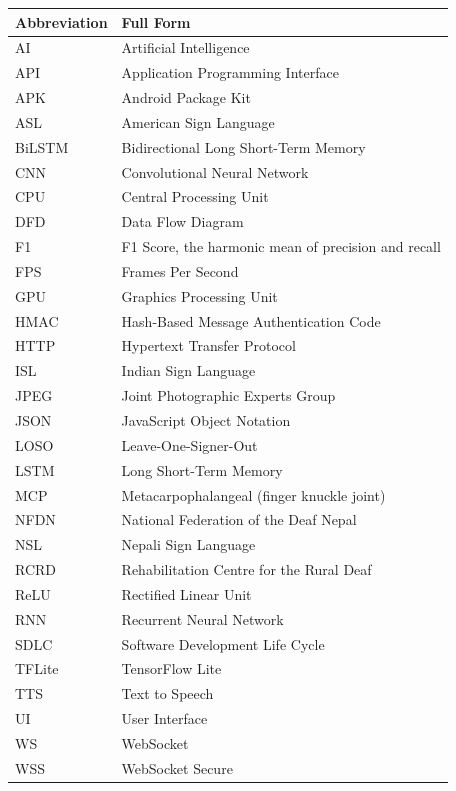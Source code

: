 \noindent\begin{tabular}{ll}
\hline
\textbf{Abbreviation} & \textbf{Full Form} \\
\hline
AI      & Artificial Intelligence \\
API     & Application Programming Interface \\
APK     & Android Package Kit \\
ASL     & American Sign Language \\
BiLSTM  & Bidirectional Long Short-Term Memory \\
CNN     & Convolutional Neural Network \\
CPU     & Central Processing Unit \\
DFD     & Data Flow Diagram \\
F1      & F1 Score, the harmonic mean of precision and recall \\
FPS     & Frames Per Second \\
GPU     & Graphics Processing Unit \\
HMAC    & Hash-Based Message Authentication Code \\
HTTP    & Hypertext Transfer Protocol \\
ISL     & Indian Sign Language \\
JPEG    & Joint Photographic Experts Group \\
JSON    & JavaScript Object Notation \\
LOSO    & Leave-One-Signer-Out \\
LSTM    & Long Short-Term Memory \\
MCP     & Metacarpophalangeal (finger knuckle joint) \\
NFDN    & National Federation of the Deaf Nepal \\
NSL     & Nepali Sign Language \\
RCRD    & Rehabilitation Centre for the Rural Deaf \\
ReLU    & Rectified Linear Unit \\
RNN     & Recurrent Neural Network \\
SDLC    & Software Development Life Cycle \\
TFLite  & TensorFlow Lite \\
TTS     & Text to Speech \\
UI      & User Interface \\
WS      & WebSocket \\
WSS     & WebSocket Secure \\
\hline
\end{tabular}
